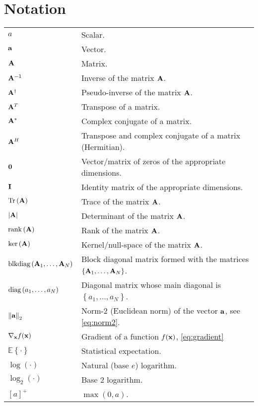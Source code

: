 \chapter*{Notation}

{ %
\renewcommand{\arraystretch}{1.5}

\begin{tabularx}{\textwidth}{lX}
$a$ & Scalar. \\
$\aa$ & Vector. \\
$\AA$ & Matrix. \\
$\AA^{-1}$ & Inverse of the matrix $\AA$. \\
$\AA^\dagger$ & Pseudo-inverse of the matrix $\AA$. \\
$\AA^T$ & Transpose of a matrix. \\
$\AA^\ast$ & Complex conjugate of a matrix. \\
$\AA^H$ & Transpose and complex conjugate of a matrix
    (Hermitian). \\
$\zero$ & Vector/matrix of zeros of the appropriate dimensions. \\
$\eye$ & Identity matrix of the appropriate dimensions. \\

$\Tr\left(\AA\right)$ & Trace of the matrix $\AA$. \\
$\left|\AA\right|$ & Determinant of the matrix $\AA$. \\
$\rank\left(\AA\right)$ & Rank of the matrix $\AA$. \\
$\ker\left(\AA\right)$ & Kernel/null-space of the matrix $\AA$. \\
$\blkdiag\left(\AA_1, \ldots, \AA_N\right)$ & Block diagonal matrix
    formed with the matrices $\left\{\AA_1, \ldots, \AA_N\right\}$. \\
$\diag\left(a_1, \ldots, a_N\right)$ & Diagonal matrix whose main
    diagonal is $\left\{a_1, \ldots, a_N\right\}$. \\
$\left\|\aa\right\|_2$ & Norm-2 (Euclidean norm) of the vector $\aa$, see
    \eqref{eq:norm2}. \\
$\nablabf_{\xx}f(\xx)$ & Gradient of a function $f(\xx)$,
    \eqref{eq:gradient} \\
$\mathbb{E}\left\{\cdot\right\}$ & Statistical expectation. \\
$\log\left(\cdot\right)$ & Natural (base $e$) logarithm. \\
$\log_2\left(\cdot\right)$ & Base 2 logarithm. \\
$\left[ a \right]^+$ & $\max\left( 0,a \right)$.
\end{tabularx}

}
